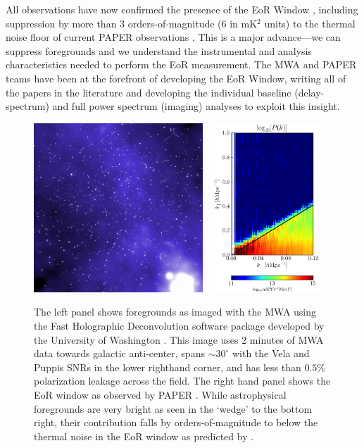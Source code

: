 \documentclass[preprint]{aastex}
\begin{document}
All observations have now confirmed the presence of the EoR Window \citep{pober_et_al2013,dillon_et_al2013b}, including suppression by more than 3 orders-of-magnitude (6 in mK$^{2}$ units) to the thermal noise floor of current PAPER observations \citep{parsons_et_al2013}. This is a major advance---we can suppress foregrounds and we understand the instrumental and analysis characteristics needed to perform the EoR measurement. The MWA and PAPER teams have been at the forefront of developing the EoR Window, writing all of the papers in the literature and developing the individual baseline (delay-spectrum) and full power spectrum (imaging) analyses to exploit this insight. 



\begin{figure}[t]
\centering
\includegraphics[height=2.5in]{plots/MWApretty.png}
~ %
\includegraphics[height=2.5in]{plots/wedge_tall.png}
\caption{\small
The left panel shows foregrounds as imaged with the MWA using the Fast Holographic Deconvolution software package developed by the University of Washington \citep{sullivan_et_al2012}. This image uses 2 minutes of MWA data towards galactic anti-center, spans $\sim$$30^{\circ}$ with the Vela and Puppis SNRs in the lower righthand corner, and has less than $0.5\%$ polarization leakage across the field. The right hand panel shows the EoR window as observed by PAPER \citep{pober_et_al2013}. While astrophysical foregrounds are very bright as seen in the `wedge' to the bottom right, their contribution falls by orders-of-magnitude to below the thermal noise in the EoR window as predicted by \citealt{morales_et_al2012,parsons_et_al2012b,vedantham_2012,trott_2012,hazelton_et_al2013}.
}\label{fig:twoFGViews}
\end{figure}
\end{document}
